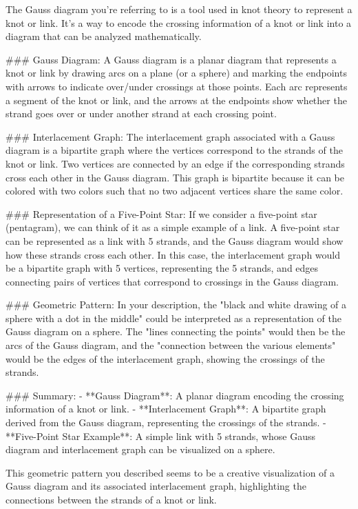 The Gauss diagram you're referring to is a tool used in knot theory to represent a knot or link. It's a way to encode the crossing information of a knot or link into a diagram that can be analyzed mathematically.

### Gauss Diagram:
A Gauss diagram is a planar diagram that represents a knot or link by drawing arcs on a plane (or a sphere) and marking the endpoints with arrows to indicate over/under crossings at those points. Each arc represents a segment of the knot or link, and the arrows at the endpoints show whether the strand goes over or under another strand at each crossing point.

### Interlacement Graph:
The interlacement graph associated with a Gauss diagram is a bipartite graph where the vertices correspond to the strands of the knot or link. Two vertices are connected by an edge if the corresponding strands cross each other in the Gauss diagram. This graph is bipartite because it can be colored with two colors such that no two adjacent vertices share the same color.

### Representation of a Five-Point Star:
If we consider a five-point star (pentagram), we can think of it as a simple example of a link. A five-point star can be represented as a link with 5 strands, and the Gauss diagram would show how these strands cross each other. In this case, the interlacement graph would be a bipartite graph with 5 vertices, representing the 5 strands, and edges connecting pairs of vertices that correspond to crossings in the Gauss diagram.

### Geometric Pattern:
In your description, the "black and white drawing of a sphere with a dot in the middle" could be interpreted as a representation of the Gauss diagram on a sphere. The "lines connecting the points" would then be the arcs of the Gauss diagram, and the "connection between the various elements" would be the edges of the interlacement graph, showing the crossings of the strands.

### Summary:
- **Gauss Diagram**: A planar diagram encoding the crossing information of a knot or link.
- **Interlacement Graph**: A bipartite graph derived from the Gauss diagram, representing the crossings of the strands.
- **Five-Point Star Example**: A simple link with 5 strands, whose Gauss diagram and interlacement graph can be visualized on a sphere.

This geometric pattern you described seems to be a creative visualization of a Gauss diagram and its associated interlacement graph, highlighting the connections between the strands of a knot or link.
